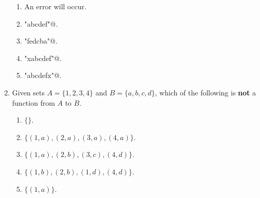 \documentclass[12pt]{article}
\begin{document}
\begin{enumerate}
\begin{enumerate}

\item An error will occur.

\item \verb@"abcdef"@.

\item \verb@"fedcba"@.  
  
\item \verb@"xabcdef"@.

\item \verb@"abcdefx"@.

\end{enumerate}


\item Given sets $A = \{1, 2, 3, 4\}$ and $B = \{a, b, c, d\}$, which of
  the following is \textbf{not} a function from $A$ to $B$.

\begin{enumerate}
\item $\{\}$.

\item $\{(1, a), (2, a), (3, a), (4, a)\}$.  

\item $\{(1, a), (2, b), (3, c), (4, d)\}$.  

\item $\{(1, b), (2, b), (1, d), (4, d)\}$.  

\item $\{(1, a)\}$.  

  
\end{enumerate}

\end{enumerate}
\end{document}
